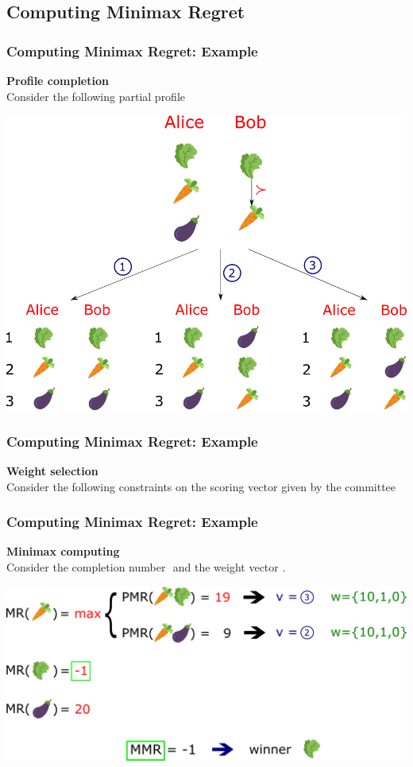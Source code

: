 \documentclass{beamer}
\begin{document}
\subsection{Computing Minimax Regret}
\begin{frame}
	\frametitle{Computing Minimax Regret: Example}
	\textbf{Profile completion}\\
	Consider the following partial profile
	\begin{center}
		\includegraphics[scale=0.35]{completion2.png}
	\end{center}
\end{frame}
\begin{frame}
	\frametitle{Computing Minimax Regret: Example}
	\textbf{Weight selection}\\
	Consider the following constraints on the scoring vector given by the committee 
\end{frame}
\begin{frame}
	\frametitle{Computing Minimax Regret: Example}
	\textbf{Minimax computing}\\
	Consider the completion number $ $ and the weight vector $ $. 
	\begin{center}
		\includegraphics[scale=0.35]{comp.png}
	\end{center}
\end{frame}
\end{document}
